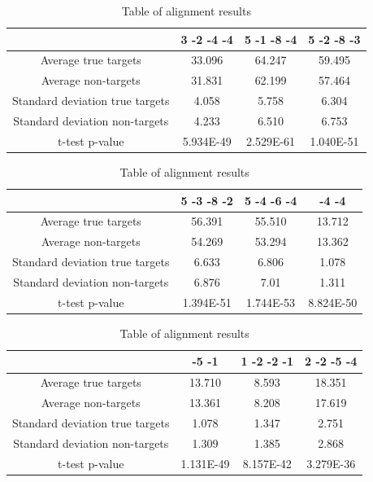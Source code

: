 \documentclass[12pt]{article}
\begin{document}
\begin{table}[h]
\centering
\footnotesize
\caption{Table of alignment results}
\vspace{0.3cm}
\begin{tabular}{c|c|c|c}
& 3 -2 -4 -4 & 5 -1 -8 -4 & 5 -2 -8 -3 \\
\hline\hline
Average true targets & 33.096 & 64.247 & 59.495	\\
Average	non-targets & 31.831 & 62.199 & 57.464 \\
\hline
Standard deviation true targets & 4.058	& 5.758 & 6.304\\
Standard deviation non-targets & 4.233 & 6.510 & 6.753 \\
\hline
t-test p-value & 5.934E-49 & 2.529E-61 & 1.040E-51 \\\hline
\end{tabular}\vspace{0.5cm}

\begin{tabular}{c|c|c|c}
& 5 -3 -8 -2 & 5 -4 -6 -4 & -4 -4 \\
\hline\hline
Average true targets & 56.391 & 55.510 & 13.712 \\
Average	non-targets & 54.269 & 53.294 & 13.362\\
\hline
Standard deviation true targets & 6.633 & 6.806 & 1.078\\
Standard deviation non-targets & 6.876 & 7.01 & 1.311\\
\hline
t-test p-value & 1.394E-51 & 1.744E-53 & 8.824E-50 \\\hline
\end{tabular}\vspace{0.5cm}


\begin{tabular}{c|c|c|c}
 & -5 -1 & 1 -2 -2 -1 & 2 -2 -5 -4  \\
\hline\hline
Average true targets & 13.710 & 8.593 & 18.351\\
Average	non-targets  & 13.361 &	8.208 &	17.619 \\
\hline
Standard deviation true targets & 1.078	& 1.347	& 2.751\\
Standard deviation non-targets & 1.309 & 1.385 & 2.868\\
\hline
t-test p-value & 1.131E-49 & 8.157E-42 & 3.279E-36 \\
\hline
\end{tabular}
\label{table:results}
\end{table}
\end{document}

